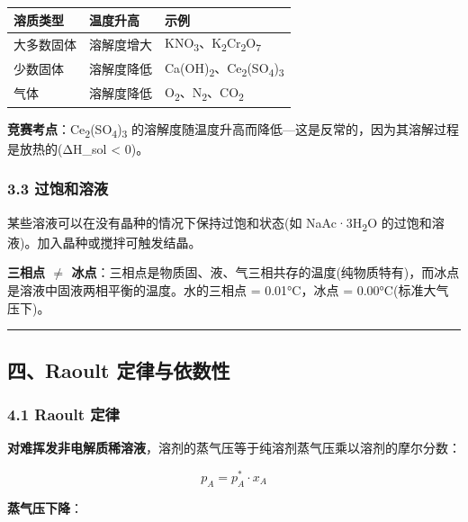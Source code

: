 \documentclass[a4paper,11pt]{ctexart}
\newcounter{none}
\begin{document}
{\def\LTcaptype{none} %
\begin{longtable}[]{@{}lll@{}}
\toprule\noalign{}
溶质类型 & 温度升高 & 示例 \\
\midrule\noalign{}
\endhead
\bottomrule\noalign{}
\endlastfoot
大多数固体 & 溶解度增大 & KNO\textsubscript{3}、K\textsubscript{2}Cr\textsubscript{2}O\textsubscript{7} \\
少数固体 & 溶解度降低 & Ca(OH)\textsubscript{2}、Ce\textsubscript{2}(SO\textsubscript{4})\textsubscript{3} \\
气体 & 溶解度降低 & O\textsubscript{2}、N\textsubscript{2}、CO\textsubscript{2} \\
\end{longtable}
}

\textbf{竞赛考点}：Ce\textsubscript{2}(SO\textsubscript{4})\textsubscript{3} 的溶解度随温度升高而降低---这是反常的，因为其溶解过程是放热的(ΔH\_sol \textless{} 0)。

\subsubsection{3.3 过饱和溶液}\label{ux8fc7ux9971ux548cux6eb6ux6db2}

某些溶液可以在没有晶种的情况下保持过饱和状态(如 NaAc·3H\textsubscript{2}O 的过饱和溶液)。加入晶种或搅拌可触发结晶。

\textbf{三相点 \(\neq\) 冰点}：三相点是物质固、液、气三相共存的温度(纯物质特有)，而冰点是溶液中固液两相平衡的温度。水的三相点 = 0.01°C，冰点 = 0.00°C(标准大气压下)。

\begin{center}\rule{0.5\linewidth}{0.5pt}\end{center}

\subsection{四、Raoult 定律与依数性}\label{ux56dbraoult-ux5b9aux5f8bux4e0eux4f9dux6570ux6027}

\subsubsection{4.1 Raoult 定律}\label{raoult-ux5b9aux5f8b}

\textbf{对难挥发非电解质稀溶液}，溶剂的蒸气压等于纯溶剂蒸气压乘以溶剂的摩尔分数：

\[
\boxed{p_A = p_A^* \cdot x_A}
\]

\textbf{蒸气压下降}：
\end{document}
